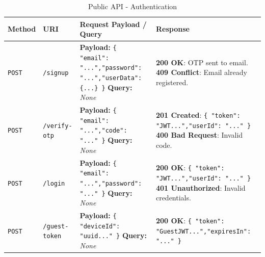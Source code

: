 \begin{table}[H]
    \sf
    \small
    \centering
    \renewcommand{\arraystretch}{1.5}
    \begin{tabularx}{\textwidth}{|l|p{2.5cm}|p{4cm}|X|}
    \hline
    \rowcolor{lightgray} \textbf{Method} & \textbf{URI} & \textbf{Request Payload / Query} & \textbf{Response} \\ \hline

    \texttt{POST} & \texttt{/signup} & 
    \textbf{Payload:} \newline \texttt{\{ "email": "...",\newline  "password": "...",\newline  "userData": \{...\} \}} \newline \textbf{Query:} \newline \textit{None} & 
    \textbf{200 OK}: OTP sent to email. \newline 
    \textbf{409 Conflict}: Email already registered. \\ \hline

    \texttt{POST} & \texttt{/verify-otp} & 
    \textbf{Payload:} \newline \texttt{\{ "email": "...",\newline  "code": "..." \}} \newline \textbf{Query:} \newline \textit{None} & 
    \textbf{201 Created}: \newline \texttt{\{ "token": "JWT...",\newline  "userId": "..." \}} \newline 
    \textbf{400 Bad Request}: Invalid code. \\ \hline

    \texttt{POST} & \texttt{/login} & 
    \textbf{Payload:} \newline \texttt{\{ "email": "...",\newline  "password": "..." \}} \newline \textbf{Query:} \newline \textit{None} & 
    \textbf{200 OK}: \newline \texttt{\{ "token": "JWT...",\newline  "userId": "..." \}} \newline 
    \textbf{401 Unauthorized}: Invalid credentials. \\ \hline
    
    \texttt{POST} & \texttt{/guest-token} & 
    \textbf{Payload:} \newline \texttt{\{ "deviceId": \newline "uuid..." \}} \newline \textbf{Query:} \newline \textit{None} & 
    \textbf{200 OK}: \newline \texttt{\{ "token": "GuestJWT...",\newline "expiresIn": "..." \}} \\ \hline
    \end{tabularx}
    \caption{Public API - Authentication}
    \label{tab:api_public_auth}
\end{table}


